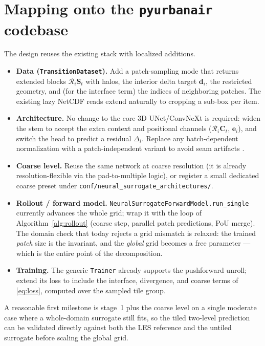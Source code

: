 \documentclass[11pt]{article}
\newcommand{\Rop}{\mathcal{R}}
\begin{document}
\section{Mapping onto the \texttt{pyurbanair} codebase}\label{sec:mapping}

The design reuses the existing stack with localized additions.

\begin{itemize}
\item \textbf{Data (\texttt{TransitionDataset}).} Add a patch-sampling mode that
returns extended blocks $\Rop_i\bm S_t$ with halos, the interior delta target
$\bm d_i$, the restricted geometry, and (for the interface term) the indices of
neighboring patches. The existing lazy NetCDF reads extend naturally to cropping
a sub-box per item.
\item \textbf{Architecture.} No change to the core 3D UNet/ConvNeXt is required:
widen the stem to accept the extra context and positional channels
($\Rop_i\bm C_t$, $\bm e_i$), and switch the head to predict a residual
$\Delta_i$. Replace any batch-dependent normalization with a patch-independent
variant to avoid seam artifacts \cite{buglakova2025tiling}.
\item \textbf{Coarse level.} Reuse the same network at coarse resolution (it is
already resolution-flexible via the pad-to-multiple logic), or register a small
dedicated coarse preset under
\texttt{conf/neural\_surrogate\_architectures/}.
\item \textbf{Rollout / forward model.}
\texttt{NeuralSurrogateForwardModel.run\_single} currently advances the whole
grid; wrap it with the loop of Algorithm~\ref{alg:rollout} (coarse step, parallel
patch predictions, PoU merge). The domain check that today rejects a grid
mismatch is relaxed: the trained \emph{patch} size is the invariant, and the
\emph{global} grid becomes a free parameter --- which is the entire point of the
decomposition.
\item \textbf{Training.} The generic \texttt{Trainer} already supports the
pushforward unroll; extend its loss to include the interface, divergence, and
coarse terms of \eqref{eq:loss}, computed over the sampled tile group.
\end{itemize}

\noindent
A reasonable first milestone is stage~1 plus the coarse level on a single
moderate case where a whole-domain surrogate still fits, so the tiled two-level
prediction can be validated directly against both the LES reference and the
untiled surrogate before scaling the global grid.



\end{document}
